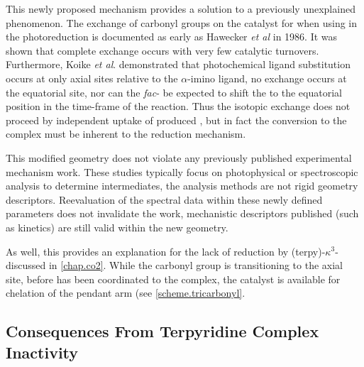 This newly proposed mechanism provides a solution to a previously unexplained phenomenon. The exchange of carbonyl groups on the catalyst for  when using  in the photoreduction is documented as early as Hawecker \textit{et al} in 1986\autocite{hawecker1986}. It was shown that complete exchange occurs with very few catalytic turnovers. Furthermore, Koike \textit{et al}. demonstrated that photochemical ligand substitution occurs at only axial sites relative to the $\alpha$-imino ligand\autocite{koike2002}, no exchange occurs at the equatorial site, nor can the \textit{fac}- be expected to shift the  to the equatorial position in the time-frame of the reaction. Thus the isotopic exchange does not proceed by independent uptake of produced , but in fact the conversion to the  complex must be inherent to the reduction mechanism. 

This modified geometry does not violate any previously published experimental mechanism work. These studies typically focus on photophysical or spectroscopic analysis to determine intermediates, the analysis methods are not rigid geometry descriptors. Reevaluation of the spectral data within these newly defined parameters does not invalidate the work, mechanistic descriptors published (such as kinetics) are still valid within the new geometry.

As well, this provides an explanation for the lack of  reduction by (terpy)-$\kappa^3$- discussed in \autoref{chap.co2}. While the carbonyl group is transitioning to the axial site, before  has been coordinated to the complex, the catalyst is available for chelation of the pendant arm (see \autoref{scheme.tricarbonyl}. 

\FloatBarrier

\subsection{Consequences From \texorpdfstring{}{Bidentate} Terpyridine Complex Inactivity}

